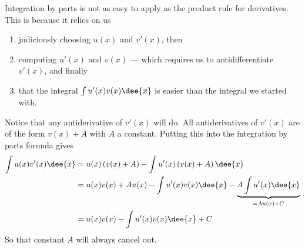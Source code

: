Integration by parts is not as easy to apply as the product rule for derivatives. This is
because it relies on us
\begin{enumerate}[(1)]
 \item judiciously choosing $u(x)$ and $v'(x)$, then
 \item computing $u'(x)$ and $v(x)$ --- which requires us to
antidifferentiate $v'(x)$, and finally
\item that the integral $\int u'(x) v(x)\dee{x}$ is easier than the integral we started
with.
\end{enumerate}

Notice that any antiderivative of $v'(x)$ will do. All antiderivatives of
$v'(x)$ are of the form $v(x)+A$ with $A$ a constant. Putting this into the
integration by parts formula gives
\begin{align*}
  \int u(x) v'(x)\dee{x} &= u(x) \left( v(x)+A \right) - \int u'(x)\left(
v(x)+A\right) \dee{x} \\
  &= u(x)v(x) + A u(x) - \int u'(x) v(x) \dee{x}- \underbrace{A \int u'(x)
\dee{x}}_{= A u(x) + C}\\
  &= u(x)v(x) - \int u'(x) v(x)\dee{x}  + C
\end{align*}
So that constant $A$ will always cancel out.




